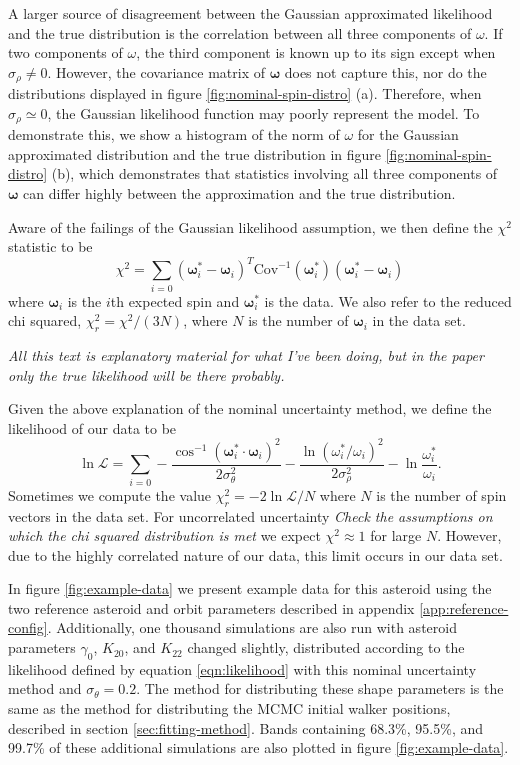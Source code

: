 \documentclass{aastex631}
\newcommand{\parens}[1]{\left( #1 \right)}
\newcommand{\jtd}[1]{{\color{red}\textit{#1}}}
\begin{document}
A larger source of disagreement between the Gaussian approximated likelihood and the true distribution is the correlation between all three components of $\omega$. If two components of $\omega$, the third component is known up to its sign except when $\sigma_\rho \neq 0$. However, the covariance matrix of $\bm \omega$ does not capture this, nor do the distributions displayed in figure \ref{fig:nominal-spin-distro} (a). Therefore, when $\sigma_\rho \simeq 0$, the Gaussian likelihood function may poorly represent the model. To demonstrate this, we show a histogram of the norm of $\omega$ for the Gaussian approximated distribution and the true distribution in figure  \ref{fig:nominal-spin-distro} (b), which demonstrates that statistics involving all three components of $\bm \omega$ can differ highly between the approximation and the true distribution.

Aware of the failings of the Gaussian likelihood assumption, we then define the $\chi^2$ statistic to be
\begin{equation}
\chi^2 = \sum_{i=0} (\bm \omega_i^* - \bm \omega_i)^T\text{Cov}^{-1}(\bm\omega^*_i)(\bm \omega_i^* - \bm \omega_i)
\label{eqn:chisq-nominal}
\end{equation}
where $\bm \omega_i$ is the $i$th expected spin and $\bm \omega_i^*$ is the data. We also refer to the reduced chi squared, $\chi^2_r = \chi^2 / (3N)$, where $N$ is the number of $\bm \omega_i$ in the data set.

\jtd{All this text is explanatory material for what I've been doing, but in the paper only the true likelihood will be there probably.}

Given the above explanation of the nominal uncertainty method, we define the likelihood of our data to be
\begin{equation}
  \ln \mathcal{L} = \sum_{i = 0}-\frac{\cos^{-1} (\bm \omega_i^* \cdot \bm \omega_i)^2}{2\sigma_\theta^2}-\frac{\ln \parens{\omega_i^* /\omega_i}^2}{2\sigma_\rho^2} - \ln\frac{\omega_i^*}{\omega_i}.
  \label{eqn:log-likelihood}
\end{equation}
Sometimes we compute the value $\chi^2_r = -2\ln \mathcal{L} / N$ where $N$ is the number of spin vectors in the data set. For uncorrelated uncertainty \jtd{Check the assumptions on which the chi squared distribution is met} we expect $\chi^2 \approx 1$ for large $N$. However, due to the highly correlated nature of our data, this limit occurs in our data set.

In figure \ref{fig:example-data} we present example data for this asteroid using the two reference asteroid and orbit parameters described in appendix \ref{app:reference-config}. Additionally, one thousand simulations are also run with asteroid parameters $\gamma_0$, $K_{20}$, and $K_{22}$ changed slightly, distributed according to the likelihood defined by equation \ref{eqn:likelihood} with this nominal uncertainty method and $\sigma_\theta = 0.2$. The method for distributing these shape parameters is the same as the method for distributing the MCMC initial walker positions, described in section \ref{sec:fitting-method}. Bands containing 68.3\%, 95.5\%, and 99.7\% of these additional simulations are also plotted in figure \ref{fig:example-data}.
\end{document}
